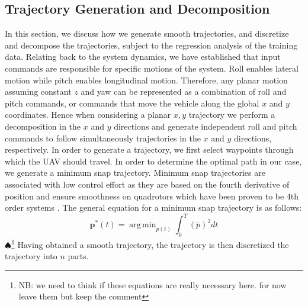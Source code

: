 \documentclass[letterpaper, 10 pt, conference]{ieeeconf}  %
\newcommand\NB[1]{$\spadesuit$\footnote{NB: #1}}
\DeclareMathOperator*{\argmin}{arg\,min}
\begin{document}
\subsection{Trajectory Generation and Decomposition} \label{sec:traj}
In this section, we discuss how we generate smooth trajectories, and discretize and decompose the trajectories, subject to the regression analysis of the training data.
Relating back to the system dynamics, we have established that input commands are responsible for specific motions of the system. Roll enables lateral motion while pitch enables longitudinal motion. Therefore, any planar motion assuming constant $z$ and yaw can be represented as a combination of roll and pitch commands, or commands that move the vehicle along the global $x$ and $y$ coordinates. Hence when considering a planar $x,y$ trajectory we perform a decomposition in the $x$ and $y$ directions and generate independent roll and pitch commands to follow simultaneously trajectories in the $x$ and $y$ directions, respectively. 
In order to generate a trajectory, we first select waypoints through which the UAV should travel. In order to determine the optimal path in our case, we generate a minimum snap trajectory. Minimum snap trajectories are associated with low control effort as they are based on the fourth derivative of position and ensure smoothness on quadrotors which have been proven to be 4th order systems \cite{minsnap}. The general equation for a minimum snap trajectory is as follows:
\begin{equation} \label{eq:minjerkint}
    \bm{p}^*(t) = \argmin_{p(t)}\int_0^T(\ddddot{p})^2dt
\end{equation}
\NB{we need to think if these equations are really necessary here. for now leave them but keep the comment}
Having obtained a smooth trajectory, the trajectory is then discretized the trajectory into $n$ parts.
\end{document}
